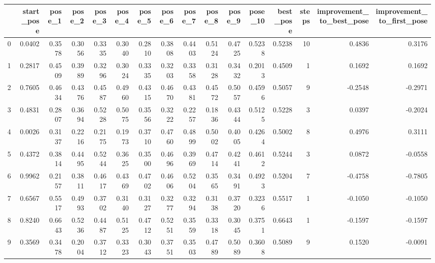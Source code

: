 \begin{tabular}{lrrrrrrrrrrrrrrr}
\toprule
{} &  start\_pose &  pose\_1 &  pose\_2 &  pose\_3 &  pose\_4 &  pose\_5 &  pose\_6 &  pose\_7 &  pose\_8 &  pose\_9 &  pose\_10 &  best\_pose &  steps &  improvement\_to\_best\_pose &  improvement\_to\_first\_pose \\
\midrule
0   &      0.0402 &  0.3578 &  0.3056 &  0.3335 &  0.3040 &  0.2810 &  0.3808 &  0.4403 &  0.5124 &  0.4725 &   0.5238 &     0.5238 &     10 &                    0.4836 &                     0.3176 \\
1   &      0.2817 &  0.4509 &  0.3989 &  0.3296 &  0.3024 &  0.3335 &  0.3203 &  0.3358 &  0.3128 &  0.3432 &   0.2013 &     0.4509 &      1 &                    0.1692 &                     0.1692 \\
2   &      0.7605 &  0.4634 &  0.4376 &  0.4587 &  0.4960 &  0.4315 &  0.4670 &  0.4381 &  0.4572 &  0.5057 &   0.4596 &     0.5057 &      9 &                   -0.2548 &                    -0.2971 \\
3   &      0.4831 &  0.2807 &  0.3694 &  0.5228 &  0.5075 &  0.3556 &  0.3222 &  0.2257 &  0.1836 &  0.4344 &   0.5125 &     0.5228 &      3 &                    0.0397 &                    -0.2024 \\
4   &      0.0026 &  0.3137 &  0.2216 &  0.2175 &  0.1973 &  0.3710 &  0.4760 &  0.4899 &  0.5002 &  0.4005 &   0.4264 &     0.5002 &      8 &                    0.4976 &                     0.3111 \\
5   &      0.4372 &  0.3814 &  0.4495 &  0.5244 &  0.3625 &  0.3500 &  0.4696 &  0.3969 &  0.4714 &  0.4241 &   0.4612 &     0.5244 &      3 &                    0.0872 &                    -0.0558 \\
6   &      0.9962 &  0.2157 &  0.3811 &  0.4617 &  0.4369 &  0.4702 &  0.4606 &  0.5204 &  0.3565 &  0.3491 &   0.4923 &     0.5204 &      7 &                   -0.4758 &                    -0.7805 \\
7   &      0.6567 &  0.5517 &  0.4993 &  0.3702 &  0.3140 &  0.3127 &  0.3277 &  0.3294 &  0.3138 &  0.3720 &   0.3236 &     0.5517 &      1 &                   -0.1050 &                    -0.1050 \\
8   &      0.8240 &  0.6643 &  0.5236 &  0.4487 &  0.5125 &  0.4712 &  0.5251 &  0.3559 &  0.3318 &  0.3045 &   0.3751 &     0.6643 &      1 &                   -0.1597 &                    -0.1597 \\
9   &      0.3569 &  0.3478 &  0.2004 &  0.3712 &  0.3323 &  0.3043 &  0.3751 &  0.3503 &  0.4789 &  0.5089 &   0.3608 &     0.5089 &      9 &                    0.1520 &                    -0.0091 \\

\end{tabular}

